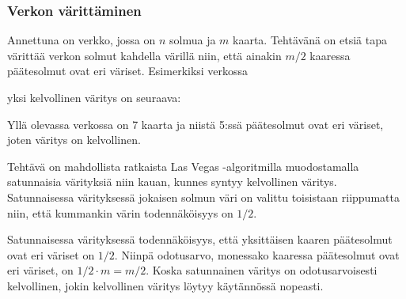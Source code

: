 \subsubsection{Verkon värittäminen}


Annettuna on verkko, jossa on $n$ solmua ja $m$ kaarta.
Tehtävänä on etsiä tapa värittää verkon solmut kahdella värillä
niin, että ainakin $m/2$ kaaressa
päätesolmut ovat eri väriset.
Esimerkiksi verkossa
\begin{center}
\end{center}
yksi kelvollinen väritys on seuraava:
\begin{center}
\end{center}
Yllä olevassa verkossa on 7 kaarta ja niistä 5:ssä
päätesolmut ovat eri väriset,
joten väritys on kelvollinen.

Tehtävä on mahdollista ratkaista Las Vegas -algoritmilla
muodostamalla satunnaisia värityksiä niin kauan,
kunnes syntyy kelvollinen väritys.
Satunnaisessa värityksessä jokaisen solmun väri on
valittu toisistaan riippumatta niin,
että kummankin värin todennäköisyys on $1/2$.

Satunnaisessa värityksessä todennäköisyys, että yksittäisen kaaren päätesolmut
ovat eri väriset on $1/2$. Niinpä odotusarvo, monessako kaaressa
päätesolmut ovat eri väriset, on $1/2 \cdot m = m/2$.
Koska satunnainen väritys on odotusarvoisesti kelvollinen,
jokin kelvollinen väritys löytyy käytännössä nopeasti.

